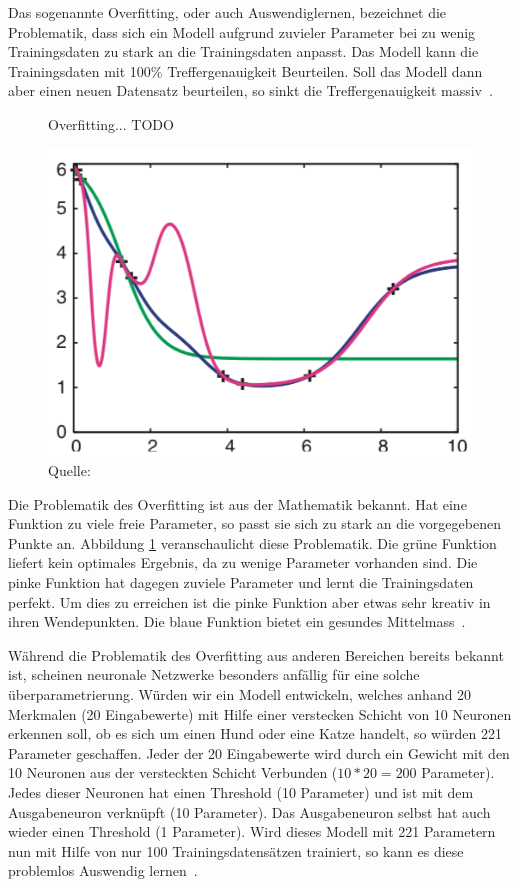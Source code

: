 Das sogenannte Overfitting, oder auch Auswendiglernen, bezeichnet die Problematik, dass sich ein Modell aufgrund zuvieler Parameter bei zu wenig Trainingsdaten zu stark an die Trainingsdaten anpasst. Das Modell kann die Trainingsdaten mit 100\% Treffergenauigkeit Beurteilen. Soll das Modell dann aber einen neuen Datensatz beurteilen, so sinkt die Treffergenauigkeit massiv~\autocite{Krogh2008}.

\begin{figure}[h]
    \caption{Overfitting... TODO}
    \label{krogh:d}
    \centering
    \includegraphics[width=0.4\linewidth]{graphics/krogh/krogh_overfitting.png}
    \caption*{Quelle: \textcite{Krogh2008}}
\end{figure}

Die Problematik des Overfitting ist aus der Mathematik bekannt. Hat eine Funktion zu viele freie Parameter, so passt sie sich zu stark an die vorgegebenen Punkte an. Abbildung \ref{krogh:d} veranschaulicht diese Problematik. Die grüne Funktion liefert kein optimales Ergebnis, da zu wenige Parameter vorhanden sind. Die pinke Funktion hat dagegen zuviele Parameter und lernt die Trainingsdaten perfekt. Um dies zu erreichen ist die pinke Funktion aber etwas sehr kreativ in ihren Wendepunkten. Die blaue Funktion bietet ein gesundes Mittelmass~\autocite{Krogh2008}.

Während die Problematik des Overfitting aus anderen Bereichen bereits bekannt ist, scheinen neuronale Netzwerke besonders anfällig für eine solche überparametrierung. Würden wir ein Modell entwickeln, welches anhand 20 Merkmalen (20 Eingabewerte) mit Hilfe einer verstecken Schicht von 10 Neuronen erkennen soll, ob es sich um einen Hund oder eine Katze handelt, so würden 221 Parameter geschaffen. Jeder der 20 Eingabewerte wird durch ein Gewicht mit den 10 Neuronen aus der versteckten Schicht Verbunden ($10 * 20 = 200$ Parameter). Jedes dieser Neuronen hat einen Threshold (10 Parameter) und ist mit dem Ausgabeneuron verknüpft (10 Parameter). Das Ausgabeneuron selbst hat auch wieder einen Threshold (1 Parameter). Wird dieses Modell mit 221 Parametern nun mit Hilfe von nur 100 Trainingsdatensätzen trainiert, so kann es diese problemlos Auswendig lernen~\autocite{Krogh2008}.


